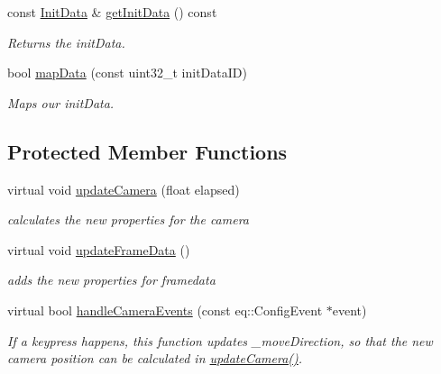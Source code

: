 \begin{CompactItemize}
const \hyperlink{a00011}{InitData} \& \hyperlink{a00003_8a5b1862bf80067322a3a0b1f530f751}{getInitData} () const 
\begin{CompactList}\small\item\em Returns the initData. \item\end{CompactList}\item 
bool \hyperlink{a00003_140db32dd04daba4cb95233e180b0327}{mapData} (const uint32\_\-t initDataID)
\begin{CompactList}\small\item\em Maps our initData. \item\end{CompactList}\end{CompactItemize}
\subsection*{Protected Member Functions}
\begin{CompactItemize}
\item 
virtual void \hyperlink{a00003_b7754b48a74e7927643d3e2e6ca3c8ed}{updateCamera} (float elapsed)
\begin{CompactList}\small\item\em calculates the new properties for the camera \item\end{CompactList}\item 
\hypertarget{a00003_be9b795ee7263d5e8343fbd4c7a00ded}{
virtual void \hyperlink{a00003_be9b795ee7263d5e8343fbd4c7a00ded}{updateFrameData} ()}
\label{a00003_be9b795ee7263d5e8343fbd4c7a00ded}

\begin{CompactList}\small\item\em adds the new properties for framedata \item\end{CompactList}\item 
virtual bool \hyperlink{a00003_b66ac34d32b4e160ec19cb39231395ac}{handleCameraEvents} (const eq::ConfigEvent $\ast$event)
\begin{CompactList}\small\item\em If a keypress happens, this function updates \_\-moveDirection, so that the new camera position can be calculated in \hyperlink{a00003_b7754b48a74e7927643d3e2e6ca3c8ed}{updateCamera()}. \item\end{CompactList}\end{CompactItemize}
